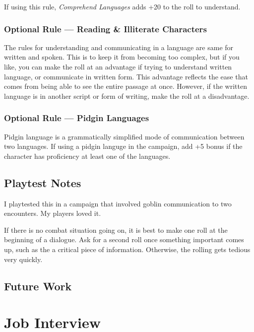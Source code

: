 \documentclass[twocolumn]{dndbook}
\begin{document}
If using this rule, \emph{Comprehend Languages} adds +20 to the roll to understand.\par

\subsubsection{Optional Rule --- Reading \& Illiterate Characters}
The rules for understanding and communicating in a language are same for written and spoken.
This is to keep it from becoming too complex, but if you like, you can make the roll at an advantage if trying to understand written language, or communicate in written form.
This advantage reflects the ease that comes from being able to see the entire passage at once.
However, if the written language is in another script or form of writing, make the roll at a disadvantage.

\subsubsection{Optional Rule --- Pidgin Languages}
Pidgin language is a grammatically simplified mode of communication between two languages.
If using a pidgin languge in the campaign, add +5 bonus if the character has proficiency at least one of the languages.



\subsection{Playtest Notes}

I playtested this in a campaign that involved goblin communication to two encounters. My players loved it.\par

If there is no combat situation going on, it is best to make one roll at the beginning of a dialogue.
Ask for a second roll once something important comes up, such as the a critical piece of information.
Otherwise, the rolling gets tedious very quickly.

\subsection{Future Work}





\section{Job Interview}
\label{sec:job_interview}
\end{document}

